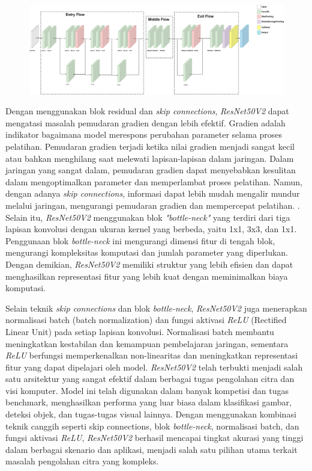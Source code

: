 \begin{figure}[!hbt]
  \centering
  \includegraphics[width=0.8\linewidth]{gambar/bener/Arsitektur_ModelCNNResNet50V2_Dasar.png}
  \label{fig:ArsitekturResNet50V2}
\end{figure}

Dengan menggunakan blok residual dan \textit{skip connections}, \textit{ResNet50V2} dapat mengatasi masalah pemudaran gradien dengan lebih efektif. Gradien adalah indikator bagaimana model merespons perubahan parameter selama proses pelatihan. Pemudaran gradien terjadi ketika nilai gradien menjadi sangat kecil atau bahkan menghilang saat melewati lapisan-lapisan dalam jaringan. Dalam jaringan yang sangat dalam, pemudaran gradien dapat menyebabkan kesulitan dalam mengoptimalkan parameter dan memperlambat proses pelatihan. Namun, dengan adanya \textit{skip connections}, informasi dapat lebih mudah mengalir mundur melalui jaringan, mengurangi pemudaran gradien dan mempercepat pelatihan. \cite{prusty2022resnet50v2} . Selain itu, \textit{ResNet50V2} menggunakan blok \textit{"bottle-neck"} yang terdiri dari tiga lapisan konvolusi dengan ukuran kernel yang berbeda, yaitu 1x1, 3x3, dan 1x1. Penggunaan blok \textit{bottle-neck} ini mengurangi dimensi fitur di tengah blok, mengurangi kompleksitas komputasi dan jumlah parameter yang diperlukan. Dengan demikian, \textit{ResNet50V2} memiliki struktur yang lebih efisien dan dapat menghasilkan representasi fitur yang lebih kuat dengan meminimalkan biaya komputasi.

Selain teknik \textit{skip connections} dan blok \textit{bottle-neck}, \textit{ResNet50V2} juga menerapkan normalisasi batch (batch normalization) dan fungsi aktivasi \textit{ReLU} (Rectified Linear Unit) pada setiap lapisan konvolusi. Normalisasi batch membantu meningkatkan kestabilan dan kemampuan pembelajaran jaringan, sementara \textit{ReLU} berfungsi memperkenalkan non-linearitas dan meningkatkan representasi fitur yang dapat dipelajari oleh model. \textit{ResNet50V2} telah terbukti menjadi salah satu arsitektur yang sangat efektif dalam berbagai tugas pengolahan citra dan visi komputer. Model ini telah digunakan dalam banyak kompetisi dan tugas benchmark, menghasilkan performa yang luar biasa dalam klasifikasi gambar, deteksi objek, dan tugas-tugas visual lainnya. Dengan menggunakan kombinasi teknik canggih seperti skip connections, blok \textit{bottle-neck}, normalisasi batch, dan fungsi aktivasi \textit{ReLU}, \textit{ResNet50V2} berhasil mencapai tingkat akurasi yang tinggi dalam berbagai skenario dan aplikasi, menjadi salah satu pilihan utama terkait masalah pengolahan citra yang kompleks.

